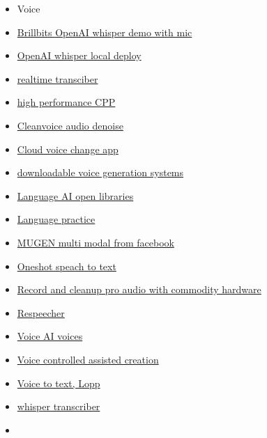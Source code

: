 \begin{itemize}
\begin{itemize}
{    tuned model}
  \item
    \href{https://github.com/Wladastic/Auto-GPT-Telegram-Plugin}{Telegram
    bot AutoGPT integration}
  \end{itemize}
\item
  Voice
\item
  \href{https://www.youtube.com/watch?v=nwPaRSlDSaY}{Brillbits OpenAI
  whisper demo with mic}
\item
  \href{https://github.com/openai/whisper}{OpenAI whisper local deploy}
\item
  \href{https://github.com/davabase/transcriber_app/}{realtime
  transciber}
\item
  \href{https://github.com/ggerganov/whisper.cpp}{high performance CPP}
\item
  \href{https://cleanvoice.ai/}{Cleanvoice audio denoise}
\item
  \href{https://voice.ai/}{Cloud voice change app}
\item
  \href{https://github.com/neonbjb/tortoise-tts}{downloadable voice
  generation systems}
\item
  \href{https://txt.cohere.ai/introducing-sandbox-coheres-experimental-open-source-initiative/}{Language
  AI open libraries}
\item
  \href{https://huggingface.co/spaces/JavaFXpert/Chat-GPT-LangChain}{Language
  practice}
\item
  \href{https://mugen-org.github.io/}{MUGEN multi modal from facebook}
\item
  \href{https://atosystem.github.io/blogs/speechclip}{Oneshot speach to
  text}
\item
  \href{https://podcastle.ai/}{Record and cleanup pro audio with
  commodity hardware}
\item
  \href{https://variety.com/2022/digital/news/james-earl-jones-darth-vader-retiring-star-wars-ai-1235382827/}{Respeecher}
\item
  \href{https://voice.ai/}{Voice AI voices}
\item
  \href{https://the-decoder.com/developer-combines-stable-diffusion-whisper-and-gpt-3-for-a-futuristic-design-assistant/}{Voice
  controlled assisted creation}
\item
  \href{https://blog.lopp.net/open-source-transcription-software-comparisons/}{Voice
  to text, Lopp}
\item
  \href{https://github.com/modal-labs/modal-examples/tree/main/misc/whisper_pod_transcriber}{whisper
  transcriber}
\item

\end{itemize}
